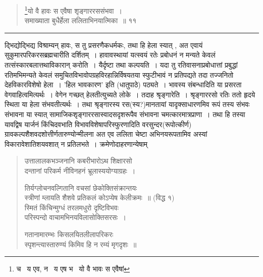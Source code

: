 \documentclass[11pt, openany]{book}
\begin{document}
\newpage

\begin{quote}
 \renewcommand{\thefootnote}{1}\footnote{च \textendash\ य एव, न \textendash\ य एष भ \textendash\ यो वै भावः स एवैषां }यो वै हावः स एवैषा शृङ्गाररससंभवा~।\\
समाख्याता बुधैर्हेला ललिताभिनयात्मिका~॥ ११ 
\end{quote}

\hrule

\vspace{2mm}
\noindent
द्भिद्योद्भिद्य विश्राम्यन् हावः, स तु प्रसरणैकधर्मकः, तथा हि हेला स्यात् , अत एवायं सुकुमारपरिकरसब्रह्मचारीति दर्शितम्~। हावावस्थायां यत्स्वयं रतेः प्रबोधनं न मन्यते केवलं तत्संस्कारबलात्तथाविकारान् करोति~। यैर्दृष्टा तथा कल्पयति~। यदा तु रतिवासनाप्रबोधात्तां प्रबुद्धां रतिमभिमन्यते केवलं समुचितविभावोपग्रहविरहान्निर्विषयतया स्फुटीभावं न प्रतिपद्यते तदा तज्जनितो देहविकारविशेषो हेला~। 'हिल भावकारण' इति (धातुपाठे) पठ्यते~। भावस्य संबन्धादिति या प्रसरता वेगवाहित्वमित्यर्थः~। वेगेन गच्छत् हेलतीत्युच्यते लोके~। तदाह श्रृङ्गारेति~। श्रृङ्गाररसो रतिः ततो हृदये स्थिता या हेला संभवतीत्यर्थः~। तथा श्रृङ्गारस्य रस(स्य?)मानतायां यादृक्साधारणमिव रूपं तस्य संभवः संभावना या स्यात् सामाजिकशृङ्गाररसास्वादसदृशरूपैव संभावना चमत्कारमात्रप्राणा~। तथा हि तस्या यावद्विष यार्जनं किंचिदवभाति विभावविशेषापरिस्फुरणादिति वरसुन्दर(रूपोत्कीर्ण) ग्रावकल्पशैशवदशोत्तीर्णतारुण्योन्मीलना अत एव ललिता चेष्टा अभिनयरूपतामिव अस्यां विकारावेशातिशयवशात् न प्रतिलभते~। क्रमेणोदाहरणान्येषाम्\textendash\ 

\begin{quote}
 {\qt उत्तालालकभञ्जनानि कबरीभारोऽथ शिक्षारसो \\
दन्तानां परिकर्म नीविनहनं भ्रूलास्ययोग्याग्रहः~। 

तिर्यग्लोचनवल्गितानि वचसां छेकोक्तिसंक्रान्तयः\\ 
स्त्रीणां म्लायति शैशवे प्रतिकलं कोऽप्येष केलीक्रमः~॥ (विद्ध १)\\

स्मितं किंचिन्मुग्धं तरलमधुरो दृष्टिविभवः \\
 परिस्पन्दो वाचामभिनयविलासोक्तिसरसः~। 

गतानामारम्भः किसलयितलीलापरिकरः \\
स्पृशन्त्यास्तारुण्यं किमिव हि न रम्यं मृगदृशः~॥
}
\end{quote}

\newpage
\end{document}
